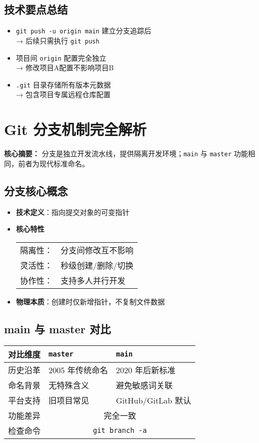 \subsection{技术要点总结}
\begin{itemize}[leftmargin=*, nosep]
    \item \texttt{git push -u origin main} 建立分支追踪后 \\
    → 后续只需执行 \texttt{git push}
    
    \item 项目间 \texttt{origin} 配置完全独立 \\
    → 修改项目A配置不影响项目B
    
    \item \texttt{.git} 目录存储所有版本元数据 \\
    → 包含项目专属远程仓库配置
\end{itemize}


\section{Git 分支机制完全解析}
\textbf{核心摘要：}  
分支是独立开发流水线，提供隔离开发环境；\texttt{main} 与 \texttt{master} 功能相同，前者为现代标准命名。

\subsection{分支核心概念}
\begin{itemize}[leftmargin=*, nosep]
    \item \textbf{技术定义}：指向提交对象的可变指针
    \item \textbf{核心特性} \\
    \begin{tabular}{@{}ll@{}}
        隔离性： & 分支间修改互不影响 \\
        灵活性： & 秒级创建/删除/切换 \\
        协作性： & 支持多人并行开发 \\
    \end{tabular}
    \item \textbf{物理本质}：创建时仅新增指针，不复制文件数据
\end{itemize}

\subsection{main 与 master 对比}
\begin{center}
\begin{tabular}{lll}
    \toprule
    \textbf{对比维度} & \texttt{master} & \texttt{main} \\
    \midrule
    历史沿革 & 2005 年传统命名 & 2020 年后新标准 \\
    命名背景 & 无特殊含义 & 避免敏感词关联 \\
    平台支持 & 旧项目常见 & GitHub/GitLab 默认 \\
    功能差异 & \multicolumn{2}{c}{完全一致} \\
    检查命令 & \multicolumn{2}{c}{\texttt{git branch -a}} \\
    \bottomrule
\end{tabular}
\end{center}

